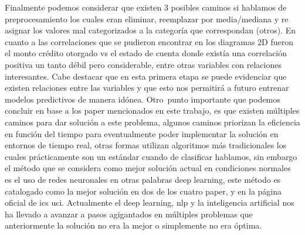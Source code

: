 \documentclass[12pt]{report}
\renewcommand{\_}{\kern-1.5pt\textunderscore\kern-1.5pt}
\begin{document}
\vspace{\baselineskip}
Finalmente podemos considerar que existen 3 posibles caminos si hablamos de preprocesamiento los cuales eran eliminar, reemplazar por media/mediana y re asignar los valores mal categorizados a la categoría que correspondan (otros).
En cuanto a las correlaciones que se pudieron encontrar en los diagramas 2D fueron el monto crédito otorgado vs el estado de cuenta donde existía una correlación positiva un tanto débil pero considerable, entre otras variables con relaciones interesantes. Cabe destacar que en esta primera etapa se puede evidenciar que existen relaciones entre las variables y que esto nos permitirá a futuro entrenar modelos predictivos de manera idónea.
Otro\ punto importante que podemos concluir en base a los paper mencionados en este trabajo, es que existen múltiples caminos para dar solución a este problema, algunos caminos  priorizan la eficiencia en función del tiempo para eventualmente poder implementar la solución en entornos de tiempo real, otras formas utilizan algoritmos más tradicionales los cuales prácticamente son un estándar cuando de clasificar hablamos, sin embargo el método que se considera como mejor solución actual en condiciones normales es el uso de redes neuronales en otras palabras deep learning, este método es catalogado como la mejor solución en dos de los cuatro paper, y en la página oficial de ics uci.
Actualmente el deep learning, nlp y la inteligencia artificial nos ha llevado a avanzar a pasos agigantados en múltiples problemas que anteriormente la solución no era la mejor o simplemente no era óptima.

\vspace{\baselineskip}

\vspace{\baselineskip}

\vspace{\baselineskip}

\vspace{\baselineskip}

\vspace{\baselineskip}

\vspace{\baselineskip}

\vspace{\baselineskip}

\vspace{\baselineskip}

\vspace{\baselineskip}
\end{document}
